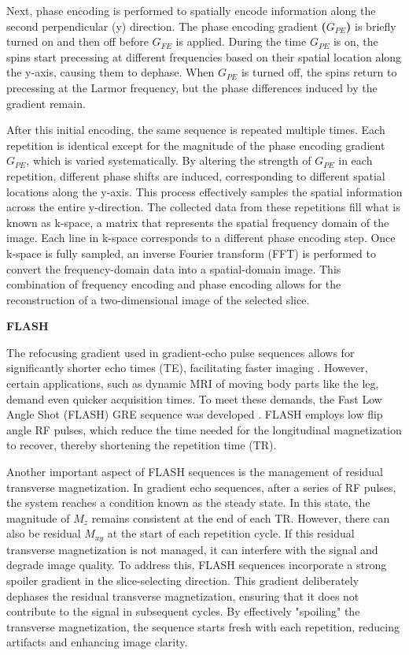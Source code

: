 \documentclass{micro-econ-thesis}
\begin{document}
Next, phase encoding is performed to spatially encode information along the second perpendicular (y) direction. The phase encoding gradient \textbf{($G_{PE}$)} is briefly turned on and then off before $G_{FE}$ is applied. During the time $G_{PE}$ is on, the spins start precessing at different frequencies based on their spatial location along the y-axis, causing them to dephase. When $G_{PE}$ is turned off, the spins return to precessing at the Larmor frequency, but the phase differences induced by the gradient remain. 

After this initial encoding, the same sequence is repeated multiple times. Each repetition is identical except for the magnitude of the phase encoding gradient $G_{PE}$, which is varied systematically. By altering the strength of $G_{PE}$ in each repetition, different phase shifts are induced, corresponding to different spatial locations along the y-axis. This process effectively samples the spatial information across the entire y-direction. The collected data from these repetitions fill what is known as k-space, a matrix that represents the spatial frequency domain of the image. Each line in k-space corresponds to a different phase encoding step. Once k-space is fully sampled, an inverse Fourier transform (FFT) is performed to convert the frequency-domain data into a spatial-domain image. This combination of frequency encoding and phase encoding allows for the reconstruction of a two-dimensional image of the selected slice.

\textbf{FLASH}

The refocusing gradient used in gradient-echo pulse sequences allows for significantly shorter echo times (TE), facilitating faster imaging \parencite[p.94]{westbrook_mri_2019}. However, certain applications, such as dynamic MRI of moving body parts like the leg, demand even quicker acquisition times. To meet these demands, the Fast Low Angle Shot (FLASH) GRE sequence was developed \parencite{haase_flash_1986}. FLASH employs low flip angle RF pulses, which reduce the time needed for the longitudinal magnetization to recover, thereby shortening the repetition time (TR). 

Another important aspect of FLASH sequences is the management of residual transverse magnetization. In gradient echo sequences, after a series of RF pulses, the system reaches a condition known as the steady state. In this state, the magnitude of $M_z$ remains consistent at the end of each TR. However, there can also be residual $M_{xy}$ at the start of each repetition cycle. If this residual transverse magnetization is not managed, it can interfere with the signal and degrade image quality. To address this, FLASH sequences incorporate a strong spoiler gradient in the slice-selecting direction. This gradient deliberately dephases the residual transverse magnetization, ensuring that it does not contribute to the signal in subsequent cycles. By effectively "spoiling" the transverse magnetization, the sequence starts fresh with each repetition, reducing artifacts and enhancing image clarity.
\end{document}
